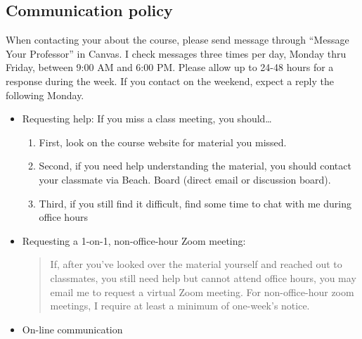 \documentclass[11pt,]{article}
\providecommand{\tightlist}{%
  \setlength{\itemsep}{0pt}\setlength{\parskip}{0pt}}
\begin{document}
\hypertarget{communication-policy}{%
\subsection{Communication policy}\label{communication-policy}}

When contacting your about the course, please send message through
``Message Your Professor'' in Canvas. I check messages three times per
day, Monday thru Friday, between 9:00 AM and 6:00 PM. Please allow up to
24-48 hours for a response during the week. If you contact on the
weekend, expect a reply the following Monday.

\begin{itemize}
\item
  Requesting help: If you miss a class meeting, you should\ldots{}

  \begin{enumerate}
  \def\labelenumi{\arabic{enumi}.}
  \tightlist
  \item
    First, look on the course website for material you missed.
  \item
    Second, if you need help understanding the material, you should
    contact your classmate via Beach. Board (direct email or discussion
    board).
  \item
    Third, if you still find it difficult, find some time to chat with
    me during office hours
  \end{enumerate}
\item
  Requesting a 1-on-1, non-office-hour Zoom meeting:

  \begin{quote}
  If, after you've looked over the material yourself and reached out to
  classmates, you still need help but cannot attend office hours, you
  may email me to request a virtual Zoom meeting. For non-office-hour
  zoom meetings, I require at least a minimum of one-week's notice.
  \end{quote}
\item
  On-line communication


\end{itemize}
\end{document}
